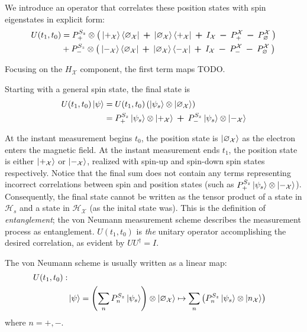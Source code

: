 We introduce an operator that correlates these position states with spin eigenstates in explicit form:
\begin{align} \label{eq: Experiment 1 unitary operator}
  U(t_1, t_0) &= P^{S_z}_+ \otimes \left(\: \ket{+_{\mathcal{X}}}\bra{\varnothing_\mathcal{X}} \: \bm{+} \: \ket{\varnothing_\mathcal{X}}\bra{+_\mathcal{X}} \: \bm{+} \: I_\mathcal{X} \: \bm{-} \: P^\mathcal{X}_+  \: \bm{-} \: P^\mathcal{X}_\varnothing \: \right) \\ \nonumber
  &+ P^{S_z}_- \otimes \left( \: \ket{-_{\mathcal{X}}}\bra{\varnothing_\mathcal{X}} \: \bm{+} \: \ket{\varnothing_\mathcal{X}}\bra{-_\mathcal{X}} \: \bm{+} \: I_\mathcal{X} \: \bm{-} \: P^\mathcal{X}_-  \: \bm{-} \: P^\mathcal{X}_\varnothing \: \right)
\end{align}

Focusing on the $H_\mathcal{X}$ component, the first term maps TODO.

Starting with a general spin state, the final state is
\begin{align} \label{eq: Experiment 1 final state}
  U(t_1, t_0)\ket{\psi} & =  U(t_1, t_0) \left(\ket{\psi_s} \otimes \ket{\varnothing_\mathcal{X}} \right) \\
  &= \nonumber P^{S_z}_+ \ket{\psi_s} \otimes \ket{+_{\mathcal{X}}} \: \bm{+} \: P^{S_z}_- \ket{\psi_s} \otimes \ket{-_{\mathcal{X}}}
\end{align}

At the instant measurement begins $t_0$, the position state is $\ket{\varnothing_\mathcal{X}}$ as the electron enters the magnetic field. At the instant measurement ends $t_1$, the position state is either $\ket{+_{\mathcal{X}}}$ or $\ket{-_{\mathcal{X}}}$, realized with spin-up and spin-down spin states respectively. Notice that the final sum does not contain any terms representing incorrect correlations between spin and position states (such as $ P^{S_z}_+ \ket{\psi_s} \otimes \ket{-_{\mathcal{X}}}$).  Consequently, the final state cannot be written as the tensor product of a state in $\mathcal{H}_s$ and a state in $\mathcal{H}_\mathcal{X}$ (as the inital state was). This is the definition of \textit{entanglement}; the von Neumann measurement scheme describes the measurement process as entanglement. $U(t_1, t_0)$ is \textit{the} unitary operator accomplishing the desired correlation, as evident by $UU^\dagger = I$.

The von Neumann scheme is usually written as a linear map:
\begin{align} \label{eq: general final state}
    \nonumber U(t_1, t_0): \\
    & \ket{\psi} = \left(\sum_{n} P^{S_z}_n\ket{\psi_s}\right) \otimes \ket{\varnothing_\mathcal{X}} \mapsto \sum_{n}\left(P^{S_z}_n\ket{\psi_s} \otimes \ket{n_\mathcal{X}}\right)
\end{align}
where $n = +, -$.

